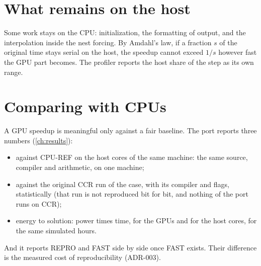 \section{What remains on the host}

Some work stays on the CPU: initialization, the formatting of output, and the interpolation inside the nest forcing.
By Amdahl's law, if a fraction $s$ of the original time stays serial on the host, the speedup cannot exceed $1/s$
however fast the GPU part becomes. The profiler reports the host share of the step as its own range.

\section{Comparing with CPUs}

A GPU speedup is meaningful only against a fair baseline. The port reports three numbers (\cref{ch:results}):
\begin{itemize}
  \item against CPU-REF on the host cores of the same machine: the same source, compiler and arithmetic,
    on one machine;
  \item against the original CCR run of the case, with its compiler and flags, statistically (that run is not
    reproduced bit for bit, and nothing of the port runs on CCR);
  \item energy to solution: power times time, for the GPUs and for the host cores, for the same simulated hours.
\end{itemize}
And it reports REPRO and FAST side by side once FAST exists. Their difference is the measured cost of
reproducibility (ADR-003).
